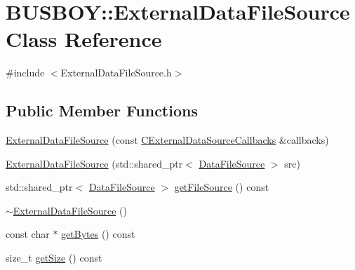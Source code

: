 \hypertarget{classBUSBOY_1_1ExternalDataFileSource}{
\section{BUSBOY::ExternalDataFileSource Class Reference}
\label{classBUSBOY_1_1ExternalDataFileSource}
}


{\ttfamily \#include $<$ExternalDataFileSource.h$>$}\subsection*{Public Member Functions}
\begin{DoxyCompactItemize}
\item 
\hyperlink{classBUSBOY_1_1ExternalDataFileSource_a7b7f299b58dc0dc6c8b79db389e6adde}{ExternalDataFileSource} (const \hyperlink{structCExternalDataSourceCallbacksStruct}{CExternalDataSourceCallbacks} \&callbacks)
\item 
\hyperlink{classBUSBOY_1_1ExternalDataFileSource_a6351940b4d69984fc0af48930ddfe59d}{ExternalDataFileSource} (std::shared\_\-ptr$<$ \hyperlink{classBUSBOY_1_1DataFileSource}{DataFileSource} $>$ src)
\item 
std::shared\_\-ptr$<$ \hyperlink{classBUSBOY_1_1DataFileSource}{DataFileSource} $>$ \hyperlink{classBUSBOY_1_1ExternalDataFileSource_af5110d99884e270b4734ec590548c6e4}{getFileSource} () const 
\item 
\hyperlink{classBUSBOY_1_1ExternalDataFileSource_a318a095806b467165d97a23f3cbbeafd}{$\sim$ExternalDataFileSource} ()
\item 
const char $\ast$ \hyperlink{classBUSBOY_1_1ExternalDataFileSource_a9a4f944051dd7b61eb6b97d73d510444}{getBytes} () const 
\item 
size\_\-t \hyperlink{classBUSBOY_1_1ExternalDataFileSource_ad1a296258ccc1809fb63fb48e3adae95}{getSize} () const 
\end{DoxyCompactItemize}


